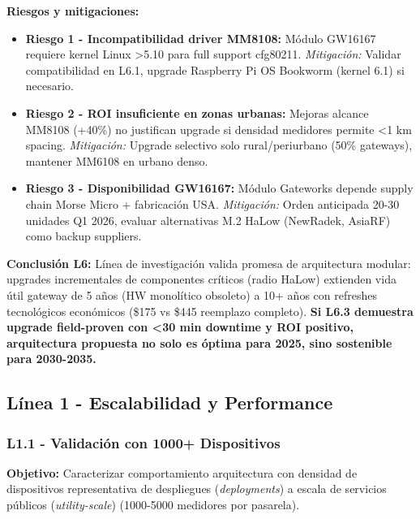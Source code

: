\textbf{Riesgos y mitigaciones:}
\begin{itemize}
    \item \textbf{Riesgo 1 - Incompatibilidad driver MM8108:} Módulo GW16167 requiere kernel Linux >5.10 para full support cfg80211. \textit{Mitigación:} Validar compatibilidad en L6.1, upgrade Raspberry Pi OS Bookworm (kernel 6.1) si necesario.
    \item \textbf{Riesgo 2 - ROI insuficiente en zonas urbanas:} Mejoras alcance MM8108 (+40\%) no justifican upgrade si densidad medidores permite <1 km spacing. \textit{Mitigación:} Upgrade selectivo solo rural/periurbano (50\% gateways), mantener MM6108 en urbano denso.
    \item \textbf{Riesgo 3 - Disponibilidad GW16167:} Módulo Gateworks depende supply chain Morse Micro + fabricación USA. \textit{Mitigación:} Orden anticipada 20-30 unidades Q1 2026, evaluar alternativas M.2 HaLow (NewRadek, AsiaRF) como backup suppliers.
\end{itemize}

\textbf{Conclusión L6:} Línea de investigación valida promesa de arquitectura modular: upgrades incrementales de componentes críticos (radio HaLow) extienden vida útil gateway de 5 años (HW monolítico obsoleto) a 10+ años con refreshes tecnológicos económicos (\$175 vs \$445 reemplazo completo). \textbf{Si L6.3 demuestra upgrade field-proven con <30 min downtime y ROI positivo, arquitectura propuesta no solo es óptima para 2025, sino sostenible para 2030-2035.}

\subsection{Línea 1 - Escalabilidad y Performance}

\subsubsection{L1.1 - Validación con 1000+ Dispositivos}

\textbf{Objetivo:} Caracterizar comportamiento arquitectura con densidad de dispositivos representativa de despliegues (\textit{deployments}) a escala de servicios públicos (\textit{utility-scale}) (1000-5000 medidores por pasarela).

